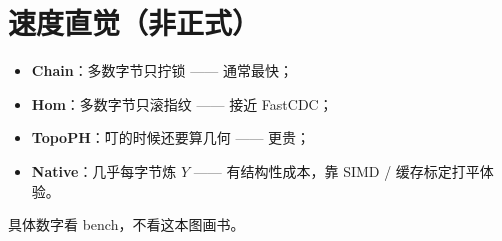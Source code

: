 \section{速度直觉（非正式）}

\begin{metaphor}[厨房计时]
\begin{itemize}[nosep]
  \item \textbf{Chain}：多数字节只拧锁 —— 通常最快；
  \item \textbf{Hom}：多数字节只滚指纹 —— 接近 FastCDC；
  \item \textbf{TopoPH}：叮的时候还要算几何 —— 更贵；
  \item \textbf{Native}：几乎每字节炼 $Y$ —— 有结构性成本，靠 SIMD / 缓存标定打平体验。
\end{itemize}
具体数字看 bench，不看这本图画书。
\end{metaphor}
